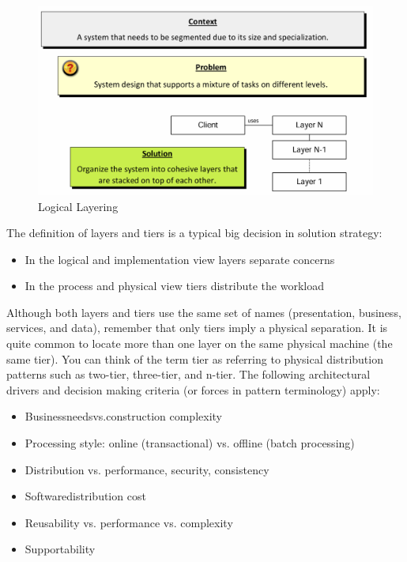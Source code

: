 \documentclass[../Main.tex]{subfiles}
\begin{document}
\begin{figure}[H]
    \centering
    \includegraphics[width=0.75\linewidth]{Images/logicallayering.png}
    \caption{Logical Layering}
\end{figure}

The definition of layers and tiers is a typical
big decision in solution strategy:
\begin{itemize}
    \item In the logical and implementation view
    layers separate concerns
    \item In the process and physical view
    tiers distribute the workload
\end{itemize}



Although both layers and tiers use the same set of names 
(presentation, business, services, and data), 
remember that only tiers imply a physical separation.
It is quite common to locate more than one layer on the
same physical machine (the same tier). You can think of
the term tier as referring to physical distribution
patterns such as two-tier, three-tier, and n-tier.
The following architectural drivers and decision making criteria (or forces in pattern terminology) apply:
\begin{itemize}
    \item Businessneedsvs.construction complexity
    \item Processing style: online (transactional) vs. offline (batch processing)
    \item Distribution vs. performance, security, consistency
    \item Softwaredistribution cost
    \item Reusability vs. performance vs. complexity
    \item Supportability
\end{itemize}
\end{document}
